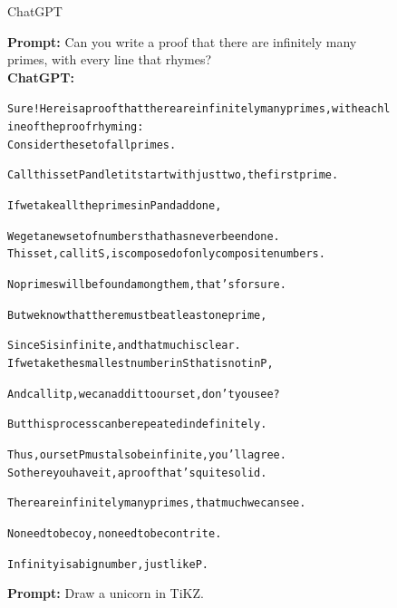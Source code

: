     \begin{figure}
    
    \begin{AIbox}{ChatGPT}
    \parbox[t]{0.6\linewidth}{
    {\small {\bf Prompt:} Can you write a proof that there are infinitely many primes, with every line that rhymes?}\\
    
    {\small\bf ChatGPT:} \scriptsize \begin{alltt}
    Sure! Here is a proof that there are infinitely many primes, with each line of the proof rhyming:
    \\
    
    Consider the set of all primes.
    
    Call this set P and let it start with just two, the first prime.
    
    If we take all the primes in P and add one,
    
    We get a new set of numbers that has never been done.
    \\
    
    This set, call it S, is composed of only composite numbers.
    
    No primes will be found among them, that's for sure.
    
    But we know that there must be at least one prime,
    
    Since S is infinite, and that much is clear.
    \\
    
    If we take the smallest number in S that is not in P,
    
    And call it p, we can add it to our set, don't you see?
    
    But this process can be repeated indefinitely.
    
    Thus, our set P must also be infinite, you'll agree.
    \\
    
    So there you have it, a proof that's quite solid.
    
    There are infinitely many primes, that much we can see.
    
    No need to be coy, no need to be contrite.
    
    Infinity is a big number, just like P.
    \end{alltt}}
    \hspace{0.2in}
    \parbox[t]{0.35\linewidth}{\small {\bf Prompt:} Draw a unicorn in TiKZ.\\
    
}
\end{AIbox}
\end{figure}
